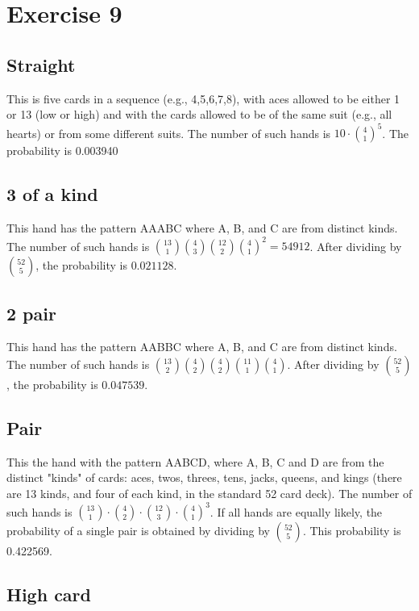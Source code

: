 \documentclass{article}
\begin{document}
\section{Exercise 9}

\subsection{Straight}

This is five cards in a sequence (e.g., 4,5,6,7,8), with aces allowed to be either 1 or 13 (low or high) and with the cards allowed to be of the same suit (e.g., all hearts) or from some different suits. The number of such hands is $10 \cdot {4 \choose 1}^5$. The probability is 0.003940

\subsection{3 of a kind}

This hand has the pattern AAABC where A, B, and C are from distinct kinds. The number of such hands is ${13 \choose 1}{4 \choose 3}{12 \choose 2}{4 \choose 1}^2 = 54 912$. After dividing by ${52 \choose 5}$, the probability is $0.021128$.

\subsection{2 pair}

This hand has the pattern AABBC where A, B, and C are from distinct kinds. The number of such hands is ${13 \choose 2}{4 \choose 2}{4 \choose 2}{11 \choose 1}{4 \choose 1}$. After dividing by ${52 \choose 5}$, the probability is $0.047539$.

\subsection{Pair}

 This the hand with the pattern AABCD, where A, B, C and D are from the distinct "kinds" of cards: aces, twos, threes, tens, jacks, queens, and kings (there are 13 kinds, and four of each kind, in the standard 52 card deck). The number of such hands is ${13 \choose 1}\cdot{4 \choose 2}\cdot{12 \choose 3}\cdot {4 \choose 1}^3$. If all hands are equally likely, the probability of a single pair is obtained by dividing by ${52 \choose 5}$. This probability is 0.422569.

\subsection{High card}
\end{document}
